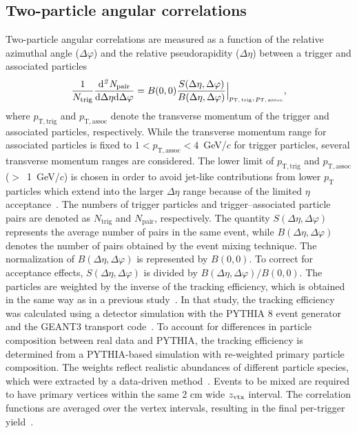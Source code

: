 \subsection{Two-particle angular correlations}
Two-particle angular correlations are measured as a function of the relative azimuthal angle ($\Delta\varphi$) and the relative pseudorapidity ($\Delta\eta$) between a trigger and associated particles
\begin{eqnarray}
\frac{1}{N_{\rm{trig}}} \frac{ \rm{d}\it{}^{2} N_{\rm{pair}} }{ \rm{d} \Delta\eta \rm{d}\Delta\varphi} = B(0, 0)\frac{S(\Delta\eta, \Delta\varphi)}{B(\Delta\eta, \Delta\varphi)}  \Big\lvert_{p_\mathrm{T,\,trig},\,p_\mathrm{T,\,assoc}},
\label{eq:corrfunction}
\end{eqnarray}
where $p_\mathrm{T,trig}$ and $p_\mathrm{T,assoc}$ denote the transverse momentum of the trigger and associated particles, respectively.
While the transverse momentum range for associated particles is fixed to $1<p_\mathrm{T,assoc}<4$~GeV/$c$ for trigger particles, several transverse momentum ranges are considered. The lower limit of $p_\mathrm{T,trig}$ and $p_\mathrm{T,assoc}$ ($>$~1~GeV/$c$) is chosen in order to avoid jet-like contributions from lower $p_\mathrm{T}$ particles which extend into the larger $\Delta\eta$ range because of the limited $\eta$ acceptance~\cite{ALICE:2021nir}. The numbers of trigger particles and trigger--associated particle pairs are denoted as $N_\mathrm{trig}$ and $N_\mathrm{pair}$, respectively.
The quantity $S(\Delta\eta, \Delta\varphi)$ represents the average number of pairs in the same event, while $B(\Delta\eta, \Delta\varphi)$ denotes the number of pairs obtained by the event mixing technique. The normalization of $B(\Delta\eta, \Delta\varphi)$ is represented by $B(0,0)$. To correct for acceptance effects, $S(\Delta\eta, \Delta\varphi)$ is divided by $B(\Delta\eta, \Delta\varphi)/B(0,0)$. The particles are weighted by the inverse of the tracking efficiency, which is obtained in the same way as in a previous study~\cite{ALICE:2021nir}. In that study, the tracking efficiency was calculated using a detector simulation with the PYTHIA 8 event generator and the GEANT3 transport code~\cite{Brun:1994aa}. To account for differences in particle composition between real data and PYTHIA, the tracking efficiency is determined from a PYTHIA-based simulation with re-weighted primary particle composition.
The weights reflect realistic abundances of different particle species, which were extracted by a data-driven method~\cite{ALICE:2018hza, ALICE:2018vuu}.
Events to be mixed are required to have primary vertices within the same 2 cm wide $z_{\rm vtx}$ interval. The correlation functions are averaged over the vertex intervals, resulting in the final per-trigger yield~\cite{Kopylov:1974th,Adam:2016tsv}. 

